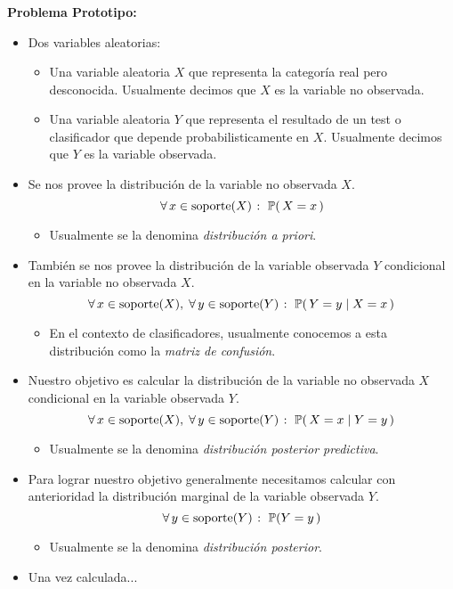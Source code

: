 \documentclass[ 10pt, xcolor = dvipsnames]{beamer}
\begin{document}
\begin{frame}[allowframebreaks]
\frametitle{\insertsection}

\textbf{Problema Prototipo:}
\begin{itemize}
\item Dos variables aleatorias: 
\begin{itemize}
\item Una variable aleatoria $X$ que representa la categor\'ia real pero desconocida. Usualmente decimos que $X$ es la variable no observada. 
\item Una variable aleatoria $Y$ que representa el resultado de un test o clasificador que depende probabilisticamente en $X$. Usualmente decimos que $Y$ es la variable observada. 
\end{itemize}
\item Se nos provee la distribuci\'on de la variable no observada $X$. \Iec
\[
\forall \, x \in \text{soporte}(X) \; \colon \; \mathbb{P}( \, X = x \, )
\]
\fullcut
\halfcut
\begin{itemize}
\item Usualmente se la denomina \emph{distribuci\'on a priori}. 
\end{itemize}
\framebreak

\item Tambi\'en se nos provee la distribuci\'on de la variable observada $Y$ condicional en la variable no observada $X$. \Iec
\[
\forall \, x \in \text{soporte}(X), \;
\forall \, y \in \text{soporte}(Y) \; \colon \; \mathbb{P}( \, Y = y \mid X = x \, )
\]
\fullcut
\halfcut
\begin{itemize}
\item En el contexto de clasificadores, usualmente conocemos a esta distribuci\'on como la \emph{matriz de confusi\'on}. 
\end{itemize}
\halfskip

\item Nuestro objetivo es calcular la distribuci\'on de la variable no observada $X$ condicional en la variable observada $Y$. \Ie 
\[
\forall \, x \in \text{soporte}(X), \;
\forall \, y \in \text{soporte}(Y) \; \colon \; \mathbb{P}( \, X = x \mid Y = y \, )
\]
\fullcut
\halfcut
\begin{itemize}
\item Usualmente se la denomina \emph{distribuci\'on posterior predictiva}. 
\end{itemize}
\framebreak

\item Para lograr nuestro objetivo generalmente necesitamos calcular con anterioridad la distribuci\'on marginal de la variable observada $Y$. \Ie 
\[
\forall \, y \in \text{soporte}(Y) \; \colon \; \mathbb{P}( Y = y \, )
\]
\fullcut
\halfcut
\begin{itemize}
\item Usualmente se la denomina \emph{distribuci\'on posterior}. 
\end{itemize}
\item Una vez calculada...

\end{itemize}

\end{frame}
\end{document}

